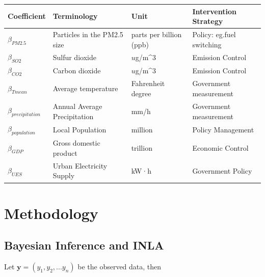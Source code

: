 \documentclass{mcmthesis}
\begin{document}
\begin{center}
\begin{tabular}{llll}
\hline
Coefficient & Terminology & Unit & Intervention Strategy \\
\hline
$\beta_{PM2.5}$&Particles in the PM2.5 size &parts per billion (ppb)&     Policy: eg.fuel switching                \\
$\beta_{SO2}$&Sulfur dioxide& $u$g/m^3     & Emission Control                      \\
$\beta_{CO2}$&Carbon dioxide& $u$g/m^3     & Emission Control             \\
$\beta_{Tmean}$&  Average temperature &Fahrenheit degree& Government measurement            \\
$\beta_{precipitation}$& Annual Average Precipitation&mm/h& Government measurement              \\
$\beta_{population}$& Local Population& million &  Policy Management                     \\
$\beta_{GDP}$&Gross domestic product & trillion &  Economic Control                     \\
$\beta_{UES}$& Urban Electricity Supply &kW·h&    Government Policy  \\
\hline 
                                
\end{tabular}

\end{center}


\section{Methodology}

\subsection{Bayesian Inference and INLA}

Let $\mathbf{y}=(y_1,y_2,...y_n)$ be the observed data, then  
\end{document}
